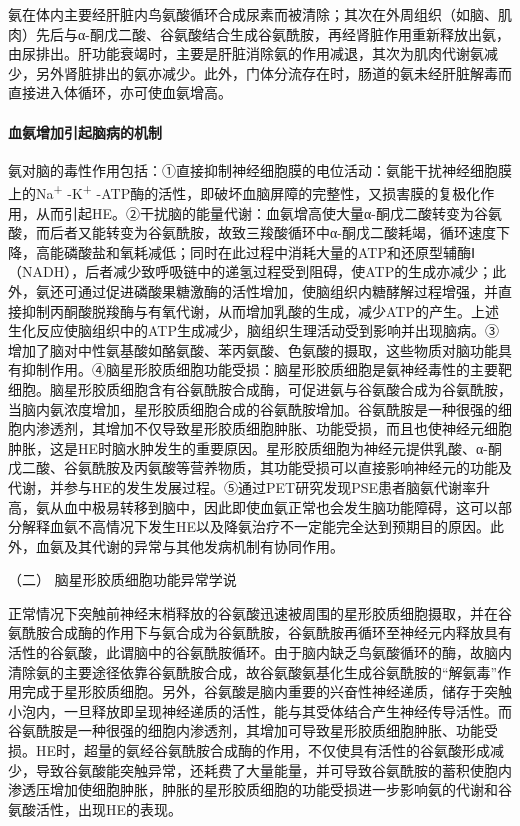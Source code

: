 氨在体内主要经肝脏内鸟氨酸循环合成尿素而被清除；其次在外周组织（如脑、肌肉）先后与α-酮戊二酸、谷氨酸结合生成谷氨酰胺，再经肾脏作用重新释放出氨，由尿排出。肝功能衰竭时，主要是肝脏消除氨的作用减退，其次为肌肉代谢氨减少，另外肾脏排出的氨亦减少。此外，门体分流存在时，肠道的氨未经肝脏解毒而直接进入体循环，亦可使血氨增高。

\paragraph{血氨增加引起脑病的机制}

氨对脑的毒性作用包括：①直接抑制神经细胞膜的电位活动：氨能干扰神经细胞膜上的Na\textsuperscript{+}
-K\textsuperscript{+}
-ATP酶的活性，即破坏血脑屏障的完整性，又损害膜的复极化作用，从而引起HE。②干扰脑的能量代谢：血氨增高使大量α-酮戊二酸转变为谷氨酸，而后者又能转变为谷氨酰胺，故致三羧酸循环中α-酮戊二酸耗竭，循环速度下降，高能磷酸盐和氧耗减低；同时在此过程中消耗大量的ATP和还原型辅酶Ⅰ（NADH），后者减少致呼吸链中的递氢过程受到阻碍，使ATP的生成亦减少；此外，氨还可通过促进磷酸果糖激酶的活性增加，使脑组织内糖酵解过程增强，并直接抑制丙酮酸脱羧酶与有氧代谢，从而增加乳酸的生成，减少ATP的产生。上述生化反应使脑组织中的ATP生成减少，脑组织生理活动受到影响并出现脑病。③增加了脑对中性氨基酸如酪氨酸、苯丙氨酸、色氨酸的摄取，这些物质对脑功能具有抑制作用。④脑星形胶质细胞功能受损：脑星形胶质细胞是氨神经毒性的主要靶细胞。脑星形胶质细胞含有谷氨酰胺合成酶，可促进氨与谷氨酸合成为谷氨酰胺，当脑内氨浓度增加，星形胶质细胞合成的谷氨酰胺增加。谷氨酰胺是一种很强的细胞内渗透剂，其增加不仅导致星形胶质细胞肿胀、功能受损，而且也使神经元细胞肿胀，这是HE时脑水肿发生的重要原因。星形胶质细胞为神经元提供乳酸、α-酮戊二酸、谷氨酰胺及丙氨酸等营养物质，其功能受损可以直接影响神经元的功能及代谢，并参与HE的发生发展过程。⑤通过PET研究发现PSE患者脑氨代谢率升高，氨从血中极易转移到脑中，因此即使血氨正常也会发生脑功能障碍，这可以部分解释血氨不高情况下发生HE以及降氨治疗不一定能完全达到预期目的原因。此外，血氨及其代谢的异常与其他发病机制有协同作用。

\hypertarget{text00101.htmlux5cux23CHP4-3-4-2-2}{}
（二） 脑星形胶质细胞功能异常学说

正常情况下突触前神经末梢释放的谷氨酸迅速被周围的星形胶质细胞摄取，并在谷氨酰胺合成酶的作用下与氨合成为谷氨酰胺，谷氨酰胺再循环至神经元内释放具有活性的谷氨酸，此谓脑中的谷氨酰胺循环。由于脑内缺乏鸟氨酸循环的酶，故脑内清除氨的主要途径依靠谷氨酰胺合成，故谷氨酸氨基化生成谷氨酰胺的“解氨毒”作用完成于星形胶质细胞。另外，谷氨酸是脑内重要的兴奋性神经递质，储存于突触小泡内，一旦释放即呈现神经递质的活性，能与其受体结合产生神经传导活性。而谷氨酰胺是一种很强的细胞内渗透剂，其增加可导致星形胶质细胞肿胀、功能受损。HE时，超量的氨经谷氨酰胺合成酶的作用，不仅使具有活性的谷氨酸形成减少，导致谷氨酸能突触异常，还耗费了大量能量，并可导致谷氨酰胺的蓄积使胞内渗透压增加使细胞肿胀，肿胀的星形胶质细胞的功能受损进一步影响氨的代谢和谷氨酸活性，出现HE的表现。

